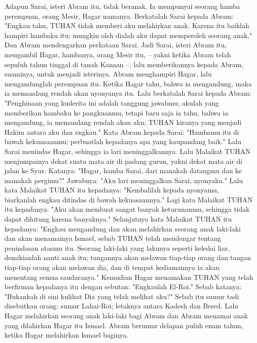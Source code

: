 \begin{biblechapter} %
 Adapun Sarai, isteri Abram itu, tidak beranak. Ia mempunyai seorang hamba perempuan, orang Mesir, Hagar namanya.
\verse Berkatalah Sarai kepada Abram: "Engkau tahu, TUHAN tidak memberi aku melahirkan anak. Karena itu baiklah hampiri hambaku itu; mungkin oleh dialah aku dapat memperoleh seorang anak." Dan Abram mendengarkan perkataan Sarai.
\verse Jadi Sarai, isteri Abram itu, mengambil Hagar, hambanya, orang Mesir itu, -- yakni ketika Abram telah sepuluh tahun tinggal di tanah Kanaan --, lalu memberikannya kepada Abram, suaminya, untuk menjadi isterinya.
\verse Abram menghampiri Hagar, lalu mengandunglah perempuan itu. Ketika Hagar tahu, bahwa ia mengandung, maka ia memandang rendah akan nyonyanya itu.
\verse Lalu berkatalah Sarai kepada Abram: "Penghinaan yang kuderita ini adalah tanggung jawabmu; akulah yang memberikan hambaku ke pangkuanmu, tetapi baru saja ia tahu, bahwa ia mengandung, ia memandang rendah akan aku; TUHAN kiranya yang menjadi Hakim antara aku dan engkau."
\verse Kata Abram kepada Sarai: "Hambamu itu di bawah kekuasaanmu; perbuatlah kepadanya apa yang kaupandang baik." Lalu Sarai menindas Hagar, sehingga ia lari meninggalkannya.
\verse Lalu Malaikat TUHAN menjumpainya dekat suatu mata air di padang gurun, yakni dekat mata air di jalan ke Syur.
\verse Katanya: "Hagar, hamba Sarai, dari manakah datangmu dan ke manakah pergimu?" Jawabnya: "Aku lari meninggalkan Sarai, nyonyaku."
\verse Lalu kata Malaikat TUHAN itu kepadanya: "Kembalilah kepada nyonyamu, biarkanlah engkau ditindas di bawah kekuasaannya."
\verse Lagi kata Malaikat TUHAN itu kepadanya: "Aku akan membuat sangat banyak keturunanmu, sehingga tidak dapat dihitung karena banyaknya."
\verse Selanjutnya kata Malaikat TUHAN itu kepadanya: "Engkau mengandung dan akan melahirkan seorang anak laki-laki dan akan menamainya Ismael, sebab TUHAN telah mendengar tentang penindasan atasmu itu.
\verse Seorang laki-laki yang lakunya seperti keledai liar, demikianlah nanti anak itu; tangannya akan melawan tiap-tiap orang dan tangan tiap-tiap orang akan melawan dia, dan di tempat kediamannya ia akan menentang semua saudaranya."
\verse Kemudian Hagar menamakan TUHAN yang telah berfirman kepadanya itu dengan sebutan: "Engkaulah El-Roi." Sebab katanya: "Bukankah di sini kulihat Dia yang telah melihat aku?"
\verse Sebab itu sumur tadi disebutkan orang: sumur Lahai-Roi; letaknya antara Kadesh dan Bered.
\verse Lalu Hagar melahirkan seorang anak laki-laki bagi Abram dan Abram menamai anak yang dilahirkan Hagar itu Ismael.
\verse Abram berumur delapan puluh enam tahun, ketika Hagar melahirkan Ismael baginya.
\end{biblechapter}

